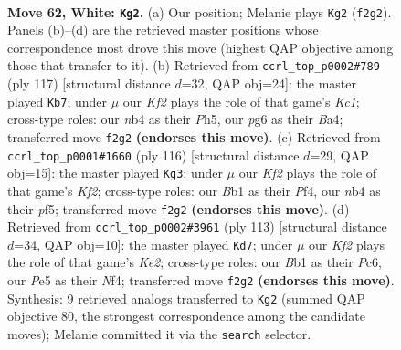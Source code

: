\documentclass[11pt]{article}
\begin{document}
\clearpage

\begin{figure}[p]\centering
\begin{subfigure}{0.46\textwidth}\centering
\resizebox{\linewidth}{!}{%
\newchessgame
\chessboard[
  setfen={8/2r2p1p/4k1p1/4P3/bn3Pp1/8/3N1K1P/1B6 w - - 14 62},
  showmover=false,
  pgfstyle=straightmove, color=movearrow, markmove={f2-g2}
]}
\caption{}
\end{subfigure}\hfill
\begin{subfigure}{0.46\textwidth}\centering
\resizebox{\linewidth}{!}{%
\newchessgame
\chessboard[
  setfen={2k5/8/p7/1pK2p1p/bP5P/P5P1/8/2B5 b - - 9 59},
  showmover=false,
  pgfstyle=straightmove, color=movearrow, markmove={c8-b7}
]}
\caption{}
\end{subfigure}
\\[4pt]
\begin{subfigure}{0.46\textwidth}\centering
\resizebox{\linewidth}{!}{%
\newchessgame
\chessboard[
  setfen={7r/8/pPB1k1p1/2Pp1p2/3P1PpP/8/5K2/8 w - - 1 59},
  showmover=false,
  pgfstyle=straightmove, color=movearrow, markmove={f2-g3}
]}
\caption{}
\end{subfigure}\hfill
\begin{subfigure}{0.46\textwidth}\centering
\resizebox{\linewidth}{!}{%
\newchessgame
\chessboard[
  setfen={8/4k2p/2p3p1/N1P1p3/1P2Pn2/4KP1P/8/8 b - - 2 57},
  showmover=false,
  pgfstyle=straightmove, color=movearrow, markmove={e7-d7}
]}
\caption{}
\end{subfigure}
\caption{\textbf{Move 62, White: \texttt{Kg2}.} (a) Our position; Melanie plays \texttt{Kg2} (\texttt{f2g2}). Panels (b)--(d) are the retrieved master positions whose correspondence most drove this move (highest QAP objective among those that transfer to it). (b) Retrieved from \texttt{ccrl\_top\_p0002\#789} (ply 117) [structural distance $d$=32, QAP obj=24]: the master played \texttt{Kb7}; under $\mu$ our \emph{Kf2} plays the role of that game's \emph{Kc1}; cross-type roles: our \emph{n}b4 as their \emph{P}h5, our \emph{p}g6 as their \emph{B}a4; transferred move \texttt{f2g2} \textbf{(endorses this move)}. (c) Retrieved from \texttt{ccrl\_top\_p0001\#1660} (ply 116) [structural distance $d$=29, QAP obj=15]: the master played \texttt{Kg3}; under $\mu$ our \emph{Kf2} plays the role of that game's \emph{Kf2}; cross-type roles: our \emph{B}b1 as their \emph{P}f4, our \emph{n}b4 as their \emph{p}f5; transferred move \texttt{f2g2} \textbf{(endorses this move)}. (d) Retrieved from \texttt{ccrl\_top\_p0002\#3961} (ply 113) [structural distance $d$=34, QAP obj=10]: the master played \texttt{Kd7}; under $\mu$ our \emph{Kf2} plays the role of that game's \emph{Ke2}; cross-type roles: our \emph{B}b1 as their \emph{P}c6, our \emph{P}e5 as their \emph{N}f4; transferred move \texttt{f2g2} \textbf{(endorses this move)}. Synthesis: 9 retrieved analogs transferred to \texttt{Kg2} (summed QAP objective 80, the strongest correspondence among the candidate moves); Melanie committed it via the \texttt{search} selector.}
\label{fig:thought-m122}
\end{figure}
\end{document}
